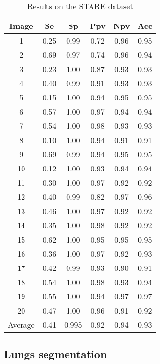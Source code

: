 \documentclass[12pt]{article}
\begin{document}
\begin{table}
    \centering
    \caption{Results on the STARE dataset}
    \label{retinal_table2_stare}
    \begin{tabular}{c|c|c|c|c|c}
     \toprule
    Image& Se &Sp &Ppv &Npv&Acc \\
    \toprule
        1 & 0.25 &  0.99  & 0.72 & 0.96 & 0.95 \\
        2 & 0.69 &  0.97  & 0.74 & 0.96 & 0.94 \\
        3 & 0.23 &  1.00  & 0.87 & 0.93 & 0.93 \\
        4 & 0.40 &  0.99  & 0.91 & 0.93 & 0.93 \\
        5 & 0.15 &  1.00  & 0.94 & 0.95 & 0.95 \\
        6 & 0.57 &  1.00  & 0.97 & 0.94 & 0.94 \\
        7 & 0.54 &  1.00  & 0.98 & 0.93 & 0.93 \\
        8 & 0.10 &  1.00  & 0.94 & 0.91 & 0.91 \\
        9 & 0.69 &  0.99  & 0.94 & 0.95 & 0.95 \\
        10 & 0.12 &  1.00  & 0.93 & 0.94 & 0.94 \\
        11 & 0.30 &  1.00  & 0.97 & 0.92 & 0.92 \\
        12 & 0.40 &  0.99  & 0.82 & 0.97 & 0.96 \\
        13 & 0.46 &  1.00  & 0.97 & 0.92 & 0.92 \\
        14 & 0.35 &  1.00  & 0.98 & 0.92 & 0.92 \\
        15 & 0.62 &  1.00  & 0.95 & 0.95 & 0.95 \\
        16 & 0.36 &  1.00  & 0.97 & 0.92 & 0.93 \\
        17 & 0.42 &  0.99  & 0.93 & 0.90 & 0.91 \\
        18 & 0.54 &  1.00  & 0.98 & 0.93 & 0.94 \\
        19 & 0.55 &  1.00  & 0.94 & 0.97 & 0.97 \\
        20 & 0.47 &  1.00  & 0.96 & 0.91 & 0.92 \\
   \midrule
    Average & 0.41& 0.995& 0.92 & 0.94& 0.93 \\
    \bottomrule
    \end{tabular}
\end{table}

\subsection{Lungs segmentation}
\end{document}
